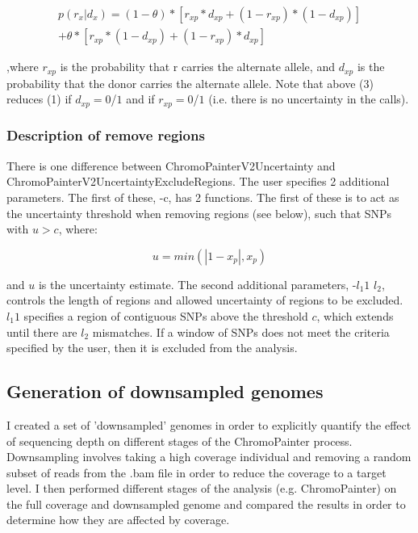 \begin{equation}
\begin{split}
p(r_{x} | d_{x}) = (1-\theta)*[r_{xp}*d_{xp} + (1-r_{xp}) * (1-d_{xp})] \\ + \theta * [r_{xp}*(1-d_{xp}) + (1-r_{xp})*d_{xp}]
\end{split}
\end{equation}

,where  $r_{xp}$ is the probability that r carries the alternate allele, and $d_{xp}$ is the probability that the donor carries the alternate allele. Note that above (3) reduces (1) if $d_{xp} = 0$/$1$ and if $r_{xp} = 0$/$1$ (i.e. there is no uncertainty in the calls).

\subsubsection{Description of remove regions}

There is one difference between ChromoPainterV2Uncertainty and ChromoPainterV2UncertaintyExcludeRegions. The user specifies 2 additional parameters. The first of these, -c, has 2 functions. The first of these is to act as the uncertainty threshold when removing regions (see below), such that SNPs with $u> c$, where:

\begin{equation}
u = min(|1-x_{p}| , x_{p})
\end{equation}

and $u$ is the uncertainty estimate. The second additional parameters, -$l_{1}1$ $l_{2}$, controls the length of regions and allowed uncertainty of regions to be excluded. $l_{1}1$ specifies a region of contiguous SNPs above the threshold $c$, which extends until there are  $l_{2}$ mismatches. If a window of SNPs does not meet the criteria specified by the user, then it is excluded from the analysis. 

\subsection{Generation of downsampled genomes}
I created a set of 'downsampled' genomes in order to explicitly quantify the effect of sequencing depth on different stages of the ChromoPainter process. Downsampling involves taking a high coverage individual and removing a random subset of reads from the .bam file in order to reduce the coverage to a target level. I then performed different stages of the analysis (e.g. ChromoPainter) on the full coverage and downsampled genome and compared the results in order to determine how they are affected by coverage.

